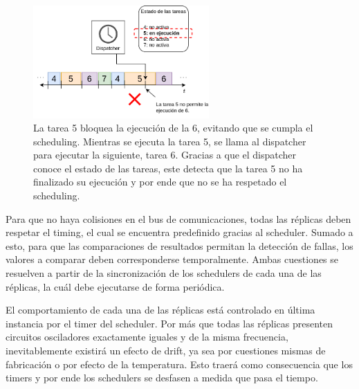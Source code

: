 \begin{figure}[!t]
    \centering
    \includegraphics[width=0.6\textwidth]{img/task_overrun.png}
    \caption{La tarea 5 bloquea la ejecución de la 6, evitando que se cumpla el scheduling. Mientras se ejecuta la tarea 5, se llama al dispatcher para ejecutar la siguiente, tarea 6. Gracias a que el dispatcher conoce el estado de las tareas, este detecta que la tarea 5 no ha finalizado su ejecución y por ende que no se ha respetado el scheduling.}
    \label{fig:task_overrun}
\end{figure}




Para que no haya colisiones en el bus de comunicaciones, todas las réplicas deben respetar el timing, el cual se encuentra predefinido gracias al scheduler. Sumado a esto, para que las comparaciones de resultados permitan la detección de fallas, los valores a comparar deben corresponderse temporalmente. Ambas cuestiones se resuelven a partir de la sincronización de los schedulers de cada una de las réplicas, la cuál debe ejecutarse de forma periódica.

El comportamiento de cada una de las réplicas está controlado en última instancia por el timer del scheduler. Por más que todas las réplicas presenten circuitos osciladores exactamente iguales y de la misma frecuencia, inevitablemente existirá un efecto de drift, ya sea por cuestiones mismas de fabricación o por efecto de la temperatura. Esto traerá como consecuencia que los timers y por ende los schedulers se desfasen a medida que pasa el tiempo. 

